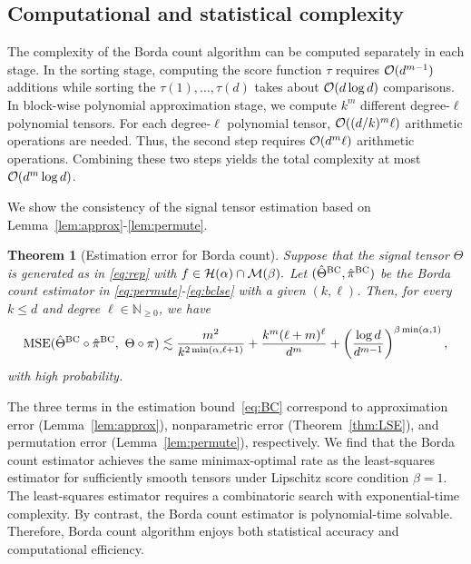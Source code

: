 \documentclass{article}
\newtheorem{thm}{Theorem}
\theoremstyle{definition}
\begin{document}
\subsection{Computational and statistical complexity}
\vspace{-.2cm}
The complexity of the Borda count algorithm can be computed separately in each stage.
In the sorting stage, computing the score function $\tau$  requires $\mathcal{O}(d^{m-1})$ additions while sorting the $\tau(1),\ldots,\tau(d)$ takes about $\mathcal{O}(d\log d)$ comparisons. In block-wise polynomial approximation stage, we compute $k^m$ different  degree-$\ell$ polynomial tensors. For each  degree-$\ell$ polynomial tensor,  $\mathcal{O}((d/k)^m\ell)$ arithmetic operations are needed. Thus, the second step requires $\mathcal{O}(d^m\ell)$ arithmetic operations.  Combining these two steps yields the total complexity at most $\mathcal{O}(d^m\log d)$.

We show the consistency of the signal tensor estimation
based on  Lemma~\ref{lem:approx}-\ref{lem:permute}.
\begin{thm}[Estimation error for Borda count]\label{thm:BC}
Suppose that the signal tensor $\Theta$ is generated as in  \eqref{eq:rep} with $f\in\mathcal{H}(\alpha)\cap \mathcal{M}(\beta).$
Let $(\hat\Theta^{\textup{BC}},\hat\pi^{\textup{BC}})$ be the Borda count estimator in \eqref{eq:permute}-\eqref{eq:bclse} with a given $(k,\ell)$. Then, for every $k\leq d$ and degree $\ell\in \mathbb{N}_{\geq 0}$, we have
\begin{align}\label{eq:BC}
     \textup{MSE}(\hat\Theta^{\textup{BC}}\circ\hat\pi^{\textup{BC}},\ \Theta\circ\pi)\lesssim  \frac{m^2}{k^{2\min(\alpha,\ell+1)}}+ \frac{k^m(\ell+m)^\ell}{d^m}+ \left({\log d\over d^{m-1}}\right)^{\beta\min(\alpha,1)},
\end{align}
with high probability.
\end{thm}
The three terms in the estimation bound~\eqref{eq:BC} correspond to approximation error (Lemma~\ref{lem:approx}), nonparametric error (Theorem~\ref{thm:LSE}), and permutation error (Lemma~\ref{lem:permute}), respectively. 
We find that the Borda count estimator achieves the same minimax-optimal rate as the least-squares estimator for sufficiently smooth tensors under Lipschitz score condition $\beta =1$. The least-squares estimator requires a combinatoric search with exponential-time complexity. By contrast, the Borda count estimator is polynomial-time solvable. Therefore, Borda count algorithm enjoys both statistical accuracy and computational efficiency. 
\end{document}
